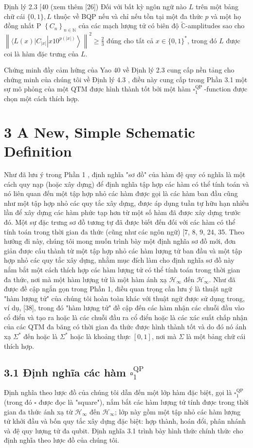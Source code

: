 \documentclass[10pt]{article}
\begin{document}
Định lý 2.3 [40 (xem thêm [26]) Đối với bất kỳ ngôn ngữ nào $L$ trên một bảng chữ cái $\{0,1\}, L$ thuộc về BQP nếu và chỉ nếu tồn tại một đa thức $p$ và một họ đồng nhất P $\left\{C_{n}\right\}_{n \in \mathbb{N}}$ của các mạch lượng tử có biên độ $\tilde{\mathbb{C}}$-amplitudes sao cho $\left\|\langle L(x)| C_{|x|}\left|x 10^{p(|x|)}\right\rangle\right\|^{2} \geq \frac{2}{3}$ đúng cho tất cả $x \in\{0,1\}^{*}$, trong đó $L$ được coi là hàm đặc trưng của $L$.

Chứng minh đầy cảm hứng của Yao 40 về Định lý 2.3 cung cấp nền tảng cho chứng minh của chúng tôi về Định lý 4.3 , điều này cung cấp trong Phần 3.1 một sự mô phỏng của một QTM được hình thành tốt bởi một hàm $\square_{1}^{\text {QP }}$-function được chọn một cách thích hợp.

\section*{3 A New, Simple Schematic Definition}
Như đã lưu ý trong Phần 1 , định nghĩa "sơ đồ" của hàm đệ quy có nghĩa là một cách quy nạp (hoặc xây dựng) để định nghĩa tập hợp các hàm có thể tính toán và nó liên quan đến một tập hợp nhỏ các hàm được gọi là các hàm ban đầu cũng như một tập hợp nhỏ các quy tắc xây dựng, được áp dụng tuần tự hữu hạn nhiều lần để xây dựng các hàm phức tạp hơn từ một số hàm đã được xây dựng trước đó. Một sự đặc trưng sơ đồ tương tự đã được biết đến đối với các hàm có thể tính toán trong thời gian đa thức (cũng như các ngôn ngữ) [7, 8, 9, 24, 35. Theo hướng đi này, chúng tôi mong muốn trình bày một định nghĩa sơ đồ mới, đơn giản được cấu thành từ một tập hợp nhỏ các hàm lượng tử ban đầu và một tập hợp nhỏ các quy tắc xây dựng, nhằm mục đích làm cho định nghĩa sơ đồ này nắm bắt một cách thích hợp các hàm lượng tử có thể tính toán trong thời gian đa thức, nơi mà một hàm lượng tử là một hàm ánh xạ $\mathcal{H}_{\infty}$ đến $\mathcal{H}_{\infty}$. Như đã được đề cập ngắn gọn trong Phần 1, điều quan trọng cần lưu ý là thuật ngữ "hàm lượng tử" của chúng tôi hoàn toàn khác với thuật ngữ được sử dụng trong, ví dụ, [38], trong đó "hàm lượng tử" đề cập đến các hàm nhận các chuỗi đầu vào cổ điển và tạo ra hoặc là các chuỗi đầu ra cổ điển hoặc là các xác suất chấp nhận của các QTM đa băng có thời gian đa thức được hình thành tốt và do đó nó ánh xạ $\Sigma^{*}$ đến hoặc là $\Sigma^{*}$ hoặc là khoảng thực $[0,1]$, nơi mà $\Sigma$ là một bảng chữ cái thích hợp.

\subsection*{3.1 Định nghĩa các hàm $\square_{1}^{\mathrm{QP}}$}
Định nghĩa theo lược đồ của chúng tôi dẫn đến một lớp hàm đặc biệt, gọi là $\square_{1}^{\mathrm{QP}}$ (trong đó $\square$ được đọc là "square"), nắm bắt các hàm lượng tử tính được trong thời gian đa thức ánh xạ từ $\mathcal{H}_{\infty}$ đến $\mathcal{H}_{\infty}$; lớp này gồm một tập nhỏ các hàm lượng tử khởi đầu và bốn quy tắc xây dựng đặc biệt: hợp thành, hoán đổi, phân nhánh và đệ quy lượng tử đa qubit. Định nghĩa 3.1 trình bày hình thức chính thức cho định nghĩa theo lược đồ của chúng tôi.
\end{document}
